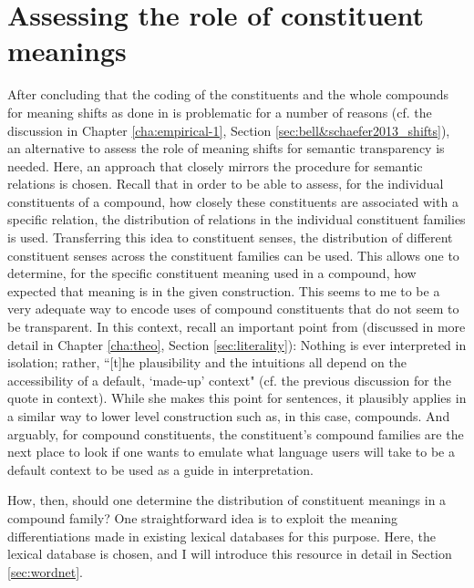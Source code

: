 \section{Assessing the role of constituent meanings}
\label{sec:meaningShiftsInFamilies}

After concluding that the coding of the constituents and the whole
compounds for meaning shifts as done in
\citet{BellandSchaefer:2013} is problematic for a number of reasons (cf. the
discussion in Chapter \ref{cha:empirical-1}, Section \ref{sec:bell&schaefer2013_shifts}), an
alternative to assess the role of meaning shifts for
semantic transparency is needed. Here, an approach that closely
mirrors the procedure for semantic relations is chosen. Recall that
in order to be able to assess, for the individual constituents of a
compound, how closely these constituents are associated with a
specific relation, the distribution of relations in the individual constituent
families is used. Transferring this idea to constituent senses, the distribution of different constituent senses across the
constituent families can be used. This allows one to determine, for the specific
constituent meaning used in a compound, how expected that meaning is
in the given construction. This seems to me to be a very adequate way
to encode uses of compound constituents that do not seem to be
transparent. In this context, recall an important point from 
\citeauthor{Jaszczolt:2016} (discussed in more detail in Chapter
\ref{cha:theo}, Section \ref{sec:literality}): Nothing is ever
interpreted in isolation; rather, ``[t]he plausibility and the
intuitions all depend on the accessibility of a default, `made-up'
context" \citet[58]{Jaszczolt:2016} (cf. the previous discussion for
the quote in context). While she makes this point for sentences, it
plausibly applies in a 
similar way to lower level construction such as, in this case,
compounds. And arguably, for compound constituents, the constituent's
compound families are the next place to look if one wants to emulate
what language users will take to be a default context to be used as a
guide in interpretation.

How, then, should one determine the distribution of constituent
meanings in a compound family? One straightforward idea is to exploit
the meaning differentiations made in
existing lexical databases for this purpose. 
Here, the  lexical
database \citep{Fellbaum:1998} is chosen, and I will introduce this resource in detail in
Section \ref{sec:wordnet}.

